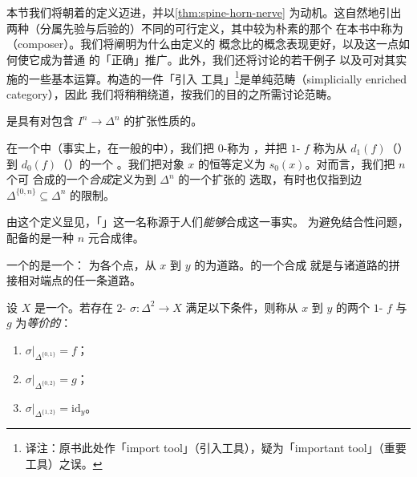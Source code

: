 \section{\trInfinityCategories{}}
\label{sec:infinity-categories}

本节我们将朝着\trInfinityCategories{}的定义迈进，并以\cref{thm:spine-horn-nerve}%
为动机。这自然地引出两种（分属先验与后验的）不同的可行定义，其中较为朴素的那个
在本书中称为\emph{\trComposer{}}（composer）。我们将阐明为什么由\trJoyal{}定义的%
\trInfinityCategory{}概念比\trComposer{}的概念表现更好，以及这一点如何使它成为普通%
\trCategory{}的「正确」推广。此外，我们还将讨论\trInfinityCategories{}的若干例子
以及可对其实施的一些基本运算。构造\trInfinityCategories{}的一件「引入%
工具」\footnote{译注：原书此处作「import tool」（引入工具），疑为「important
tool」（重要工具）之误。}是单纯\trEnrichment{}范畴（simplicially enriched category），因此
我们将稍稍绕道，按我们的目的之所需讨论\trEnrichment{}范畴。

\begin{definition}\label{def:composer}
\emph{\trComposer{}}是具有对\trSpine{}包含 $I^n \to \Delta^n$ 的扩张性质的\trSimplicialSet{}。
\end{definition}

\begin{definition}\label{def:composer-objects-morphisms}
在一个\trComposer{}中（事实上，在一般的\trSimplicialSet{}中），我们把 $0$-\trSimplex{}称为%
\emph{\trObject{}}，并把 $1$-\trSimplex{} $f$ 称为从 $d_1(f)$（\trSource{}）到 $d_0(f)$（\trTarget{}）的一个%
\emph{\trMorphism{}}。我们把对象 $x$ 的恒等\trMorphism{}定义为 $s_0(x)$。对\trComposer{}而言，我们把 $n$ 个可
合成\trMorphism{}的一个\emph{合成}定义为到 $\Delta^n$ 的一个扩张的
选取，有时也仅指到边 $\Delta^{\{0,n\}} \subseteq \Delta^n$ 的限制。
\end{definition}

由这个定义显见，「\trComposer{}」这一名称源于人们\emph{能够}合成\trMorphism{}这一事实。
为避免结合性问题，\trComposer{}配备的是一种 $n$ 元合成律。

\begin{example*}
一个\trTopologicalSpace{}的\trSingularSimplicialSet{}是一个\trComposer{}：%
\trObject{}为各个点，从 $x$ 到 $y$ 的\trMorphism{}为道路。\trMorphism{}的一个合成
就是与诸道路的拼接相对端点\trHomotopy{}的任一条道路。
\end{example*}

\begin{definition}\label{def:equivalent-1-simplices}
设 $X$ 是一个\trSimplicialSet{}。若存在 $2$-\trSimplex{} $\sigma\colon \Delta^2 \to X$
满足以下条件，则称从 $x$ 到 $y$ 的两个 $1$-\trSimplex{} $f$ 与 $g$ 为\emph{等价的}：
\begin{enumerate}[label=(\arabic*)]
  \item $\sigma|_{\Delta^{\{0,1\}}} = f$；
  \item $\sigma|_{\Delta^{\{0,2\}}} = g$；
  \item $\sigma|_{\Delta^{\{1,2\}}} = \mathrm{id}_y$。
\end{enumerate}
\end{definition}

